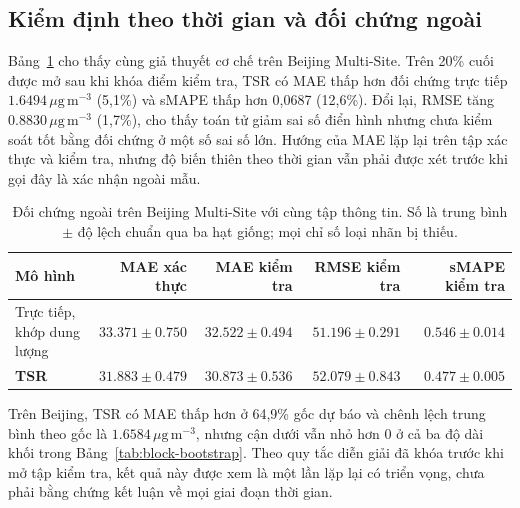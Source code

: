 \documentclass[10pt,a4paper]{article}
\newcommand{\unitpm}{\,\mu\mathrm{g}\,\mathrm{m}^{-3}}
\newcommand{\modelname}{TSR}
\begin{document}
\subsection{Kiểm định theo thời gian và đối chứng ngoài}

Bảng~\ref{tab:external-beijing} cho thấy cùng giả thuyết cơ chế trên Beijing Multi-Site. Trên 20\% cuối được mở sau khi khóa điểm kiểm tra, \modelname{} có MAE thấp hơn đối chứng trực tiếp $1.6494\unitpm$ (5,1\%) và sMAPE thấp hơn 0,0687 (12,6\%). Đổi lại, RMSE tăng $0.8830\unitpm$ (1,7\%), cho thấy toán tử giảm sai số điển hình nhưng chưa kiểm soát tốt bằng đối chứng ở một số sai số lớn. Hướng của MAE lặp lại trên tập xác thực và kiểm tra, nhưng độ biến thiên theo thời gian vẫn phải được xét trước khi gọi đây là xác nhận ngoài mẫu.

\begin{table}[H]
  \centering
  \caption{Đối chứng ngoài trên Beijing Multi-Site với cùng tập thông tin. Số là trung bình $\pm$ độ lệch chuẩn qua ba hạt giống; mọi chỉ số loại nhãn bị thiếu.}
  \label{tab:external-beijing}
  \begin{tabular}{@{}lrrrr@{}}
    \toprule
    Mô hình & MAE xác thực & MAE kiểm tra & RMSE kiểm tra & sMAPE kiểm tra \\
    \midrule
    Trực tiếp, khớp dung lượng & $33.371\pm0.750$ & $32.522\pm0.494$ & $\mathbf{51.196\pm0.291}$ & $0.546\pm0.014$ \\
    \textbf{\modelname{}} & $\mathbf{31.883\pm0.479}$ & $\mathbf{30.873\pm0.536}$ & $52.079\pm0.843$ & $\mathbf{0.477\pm0.005}$ \\
    \bottomrule
  \end{tabular}
\end{table}

Trên Beijing, \modelname{} có MAE thấp hơn ở 64,9\% gốc dự báo và chênh lệch trung bình theo gốc là $1.6584\unitpm$, nhưng cận dưới vẫn nhỏ hơn 0 ở cả ba độ dài khối trong Bảng~\ref{tab:block-bootstrap}. Theo quy tắc diễn giải đã khóa trước khi mở tập kiểm tra, kết quả này được xem là một lần lặp lại có triển vọng, chưa phải bằng chứng kết luận về mọi giai đoạn thời gian.
\end{document}

